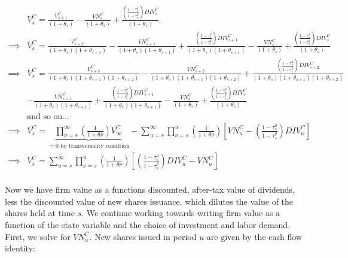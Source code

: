 \documentclass[article,11pt,letterpaper,fleqn]{article}
\theoremstyle{definition}
\numberwithin{equation}{section}
\begin{document}
\begin{equation}
\label{eqn:solve_vs}
\begin{split}
& V^{C}_{s}=\frac{V^{C}_{s+1}}{(1+\theta_{s})} - \frac{VN^{C}_{s}}{(1+\theta_{s})}  + \frac{\left(\frac{1-\tau^{d}_{s}}{1-\tau^{g}_{s}}\right)DIV^{C}_{s}}{(1+\theta_{s})} \\
\implies &  V^{C}_{s}=\frac{V^{C}_{s+2}}{(1+\theta_{s})(1+\theta_{s+1})} - \frac{VN^{C}_{s+1}}{(1+\theta_{s})(1+\theta_{s+1})}  + \frac{\left(\frac{1-\tau^{d}_{s}}{1-\tau^{g}_{s}}\right)DIV^{C}_{s+1}}{(1+\theta_{s})(1+\theta_{s+1})} - \frac{VN^{C}_{s}}{(1+\theta_{s})}  + \frac{\left(\frac{1-\tau^{d}_{s}}{1-\tau^{g}_{s}}\right)DIV^{C}_{s}}{(1+\theta_{s})} \\
\implies &  V^{C}_{s}= \frac{V^{C}_{s+3}}{(1+\theta_{s})(1+\theta_{s+1})(1+\theta_{s+2})} - \frac{VN^{C}_{s+2}}{(1+\theta_{s})(1+\theta_{s+1})(1+\theta_{s+2})}  + \frac{\left(\frac{1-\tau^{d}_{s}}{1-\tau^{g}_{s}}\right)DIV^{C}_{s+2}}{(1+\theta_{s})(1+\theta_{s+1})(1+\theta_{s+2})} \\
& - \frac{VN^{C}_{s+1}}{(1+\theta_{s})(1+\theta_{s+1})}  + \frac{\left(\frac{1-\tau^{d}_{s}}{1-\tau^{g}_{s}}\right)DIV^{C}_{s+1}}{(1+\theta_{s})(1+\theta_{s+1})} - \frac{VN^{C}_{s}}{(1+\theta_{s})}  + \frac{\left(\frac{1-\tau^{d}_{s}}{1-\tau^{g}_{s}}\right)DIV^{C}_{s}}{(1+\theta_{s})} \\
& \text{and so on...} \\
\implies & V^{C}_{s}=\underbrace{\prod_{\nu=s}^{\infty}\left(\frac{1}{1+\theta{\nu}}\right)V^{C}_{\infty}}_{=0 \text{ by transversality condition}} - \sum_{u=s}^{\infty} \prod_{\nu=s}^{u}\left(\frac{1}{1+\theta{\nu}}\right)\left[VN^{C}_{u} - \left(\frac{1-\tau^{d}_{s}}{1-\tau^{g}_{s}}\right)DIV^{C}_{u}\right]\\
\implies & V^{C}_{s}= \sum_{u=s}^{\infty} \prod_{\nu=s}^{u}\left(\frac{1}{1+\theta{\nu}}\right)\left[ \left(\frac{1-\tau^{d}_{s}}{1-\tau^{g}_{s}}\right)DIV^{C}_{u}-VN^{C}_{u}\right]\\
\end{split}
\end{equation}

Now we have firm value as a functions discounted, after-tax value of dividends, less the discounted value of new shares issuance, which dilutes the value of the shares held at time $s$.  We continue working towards writing firm value as a function of the state variable and the choice of investment and labor demand.  First, we solve for $VN^{C}_{u}$.  New shares issued in period $u$ are given by the cash flow identity:
\end{document}
